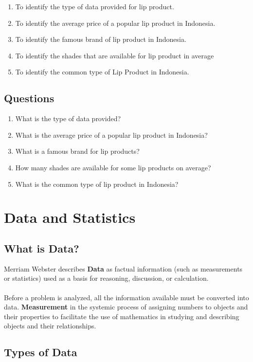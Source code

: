 \documentclass{article}
\begin{document}
\begin{enumerate}
    \item To identify the type of data provided for lip product.
    \item To identify the average price of a popular lip product in Indonesia.
    \item To identify the famous brand of lip product in Indonesia.
    \item To identify the shades that are available for lip product in average
    \item To identify the common type of Lip Product in Indonesia.
\end{enumerate}

\subsection{Questions}

\begin{enumerate}
    \item What is the type of data provided?
    \item What is the average price of a popular lip product in Indonesia?
    \item What is a famous brand for lip products?
    \item How many shades are available for some lip products on average?
    \item What is the common type of lip product in Indonesia?
\end{enumerate}

\section{Data and Statistics}

\subsection{What is Data?}
Merriam Webster describes \textbf{Data} as factual information (such as measurements or statistics) used as a basis for reasoning,  discussion, or calculation.
\\ \\
Before a problem is analyzed, all the information available must be converted into data. \textbf{Measurement} in the systemic process of assigning numbers to objects and their properties to facilitate the use of mathematics in studying and describing  objects and their relationships.

\subsection{Types of Data}
\end{document}

